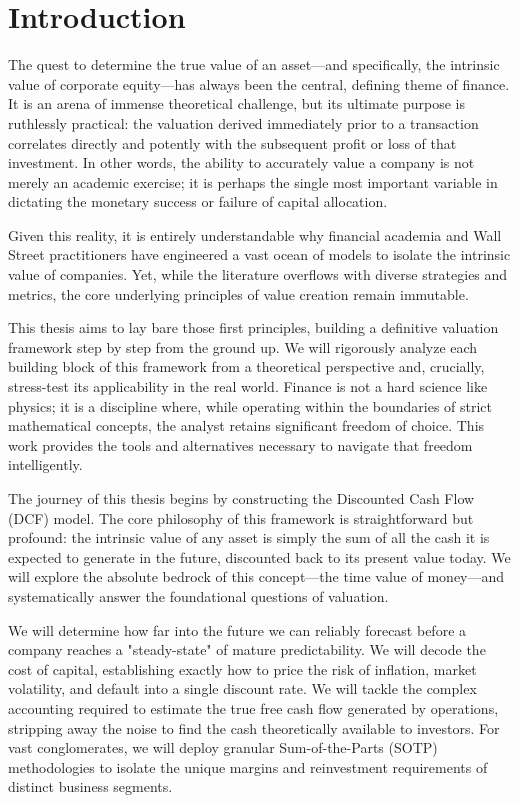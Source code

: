 \cleardoublepage
{}
{}
\chapter*{Introduction}

The quest to determine the true value of an asset—and specifically, the intrinsic value of corporate equity—has always been the central, defining theme of finance. It is an arena of immense theoretical challenge, but its ultimate purpose is ruthlessly practical: the valuation derived immediately prior to a transaction correlates directly and potently with the subsequent profit or loss of that investment. In other words, the ability to accurately value a company is not merely an academic exercise; it is perhaps the single most important variable in dictating the monetary success or failure of capital allocation.

Given this reality, it is entirely understandable why financial academia and Wall Street practitioners have engineered a vast ocean of models to isolate the intrinsic value of companies. Yet, while the literature overflows with diverse strategies and metrics, the core underlying principles of value creation remain immutable.

This thesis aims to lay bare those first principles, building a definitive valuation framework step by step from the ground up. We will rigorously analyze each building block of this framework from a theoretical perspective and, crucially, stress-test its applicability in the real world. Finance is not a hard science like physics; it is a discipline where, while operating within the boundaries of strict mathematical concepts, the analyst retains significant freedom of choice. This work provides the tools and alternatives necessary to navigate that freedom intelligently.

The journey of this thesis begins by constructing the Discounted Cash Flow (DCF) model. The core philosophy of this framework is straightforward but profound: the intrinsic value of any asset is simply the sum of all the cash it is expected to generate in the future, discounted back to its present value today. We will explore the absolute bedrock of this concept—the time value of money—and systematically answer the foundational questions of valuation.

We will determine how far into the future we can reliably forecast before a company reaches a "steady-state" of mature predictability. We will decode the cost of capital, establishing exactly how to price the risk of inflation, market volatility, and default into a single discount rate. We will tackle the complex accounting required to estimate the true free cash flow generated by operations, stripping away the noise to find the cash theoretically available to investors. For vast conglomerates, we will deploy granular Sum-of-the-Parts (SOTP) methodologies to isolate the unique margins and reinvestment requirements of distinct business segments.


